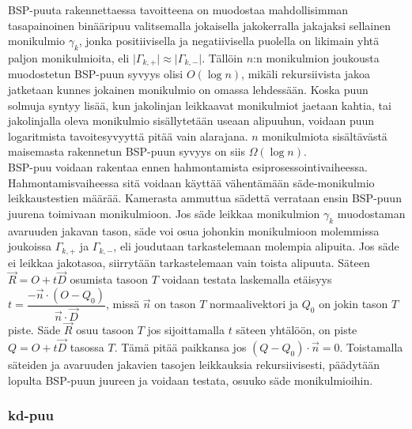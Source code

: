 \documentclass[a4paper, 12pt, titlepage]{article}
\newcommand{\abs}[1]{\vert #1 \vert} %
\begin{document}
BSP-puuta rakennettaessa tavoitteena on muodostaa mahdollisimman tasapainoinen binääripuu valitsemalla jokaisella jakokerralla jakajaksi sellainen monikulmio $\gamma_k$, jonka positiivisella ja negatiivisella puolella on likimain yhtä paljon monikulmioita, eli $\abs{\Gamma_{k,+}} \approx \abs{\Gamma_{k,-}}$. Tällöin  $n$:n monikulmion joukousta muodostetun BSP-puun syvyys olisi $O(\log n)$, mikäli rekursiivista jakoa jatketaan kunnes jokainen monikulmio on omassa lehdessään. Koska puun solmuja syntyy lisää, kun jakolinjan leikkaavat monikulmiot jaetaan kahtia, tai jakolinjalla oleva monikulmio sisällytetään useaan alipuuhun, voidaan puun logaritmista tavoitesyvyyttä pitää vain alarajana. \citep[.]{hughes} $n$ monikulmiota sisältävästä maisemasta rakennetun BSP-puun syvyys on siis $\Omega(\log n)$.\\



BSP-puu voidaan rakentaa ennen hahmontamista esiprosessointivaiheessa. Hahmontamisvaiheessa sitä voidaan käyttää vähentämään säde-monikulmio leikkaustestien määrää. Kamerasta ammuttua sädettä verrataan ensin BSP-puun juurena toimivaan monikulmioon. Jos säde leikkaa monikulmion $\gamma_k$ muodostaman avaruuden jakavan tason, säde voi osua johonkin monikulmioon molemmissa joukoissa ${\Gamma_{k,+}}$ ja ${\Gamma_{k,-}}$, eli joudutaan tarkastelemaan molempia alipuita. Jos säde ei leikkaa jakotasoa, siirrytään tarkastelemaan vain toista alipuuta. Säteen $\vec{R}=O+t\vec{D}$ osumista tasoon $T$ voidaan testata laskemalla etäisyys $t=\dfrac{-\vec{n}\cdot(O-Q_0)}{\vec{n}\cdot\vec{D}}$, missä $\vec{n}$ on tason $T$ normaalivektori ja $Q_0$ on jokin tason $T$ piste. Säde $\vec{R}$ osuu tasoon $T$ jos sijoittamalla $t$ säteen yhtälöön, on piste $Q = O+t\vec{D}$ tasossa $T$. Tämä pitää paikkansa jos $(Q-Q_0)\cdot\vec{n} = 0$. \citep[.]{hughes} Toistamalla säteiden ja avaruuden jakavien tasojen leikkauksia rekursiivisesti, päädytään lopulta BSP-puun juureen ja voidaan testata, osuuko säde monikulmioihin. \citep[.]{ranta}\\

\subsubsection{kd-puu}
\end{document}
